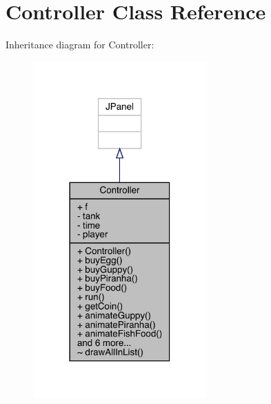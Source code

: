 \hypertarget{class_controller}{}\section{Controller Class Reference}
\label{class_controller}


Inheritance diagram for Controller\+:
\nopagebreak
\begin{figure}[H]
\begin{center}
\leavevmode
\includegraphics[width=189pt]{class_controller__inherit__graph}
\end{center}
\end{figure}


